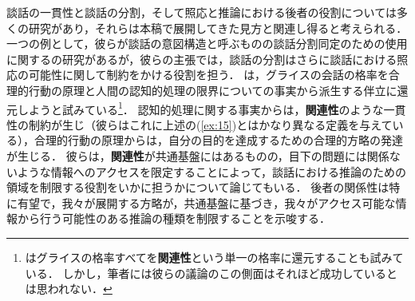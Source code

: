 \documentclass{goken}
\begin{document}
談話の一貫性と談話の分割，そして照応と推論における後者の役割については多くの研究があり，それらは本稿で展開してきた見方と関連し得ると考えられる．
一つの例として，彼らが談話の意図構造と呼ぶものの談話分割同定のための使用に関する\citet{GroszSidner1986}の研究があるが，彼らの主張では，談話の分割はさらに談話における照応の可能性に関して制約をかける役割を担う．
\citet{SperberWilson1986}は，グライスの会話の格率を合理的行動の原理と人間の認知的処理の限界についての事実から派生する伴立に還元しようと試みている\footnote{%
  \citeauthor{SperberWilson1986}はグライスの格率すべてを\textbf{関連性}という単一の格率に還元することも試みている．
  しかし，筆者には彼らの議論のこの側面はそれほど成功しているとは思われない．
}．
認知的処理に関する事実からは，\textbf{関連性}のような一貫性の制約が生じ（彼らはこれに上述の(\ref{ex:15})とはかなり異なる定義を与えている），合理的行動の原理からは，自分の目的を達成するための合理的方略の発達が生じる．
彼らは，\textbf{関連性}が共通基盤にはあるものの，目下の問題には関係ないような情報へのアクセスを限定することによって，談話における推論のための領域を制限する役割をいかに担うかについて論じてもいる．
後者の関係性は特に有望で，我々が展開する方略が，共通基盤に基づき，我々がアクセス可能な情報から行う可能性のある推論の種類を制限することを示唆する．
\end{document}
